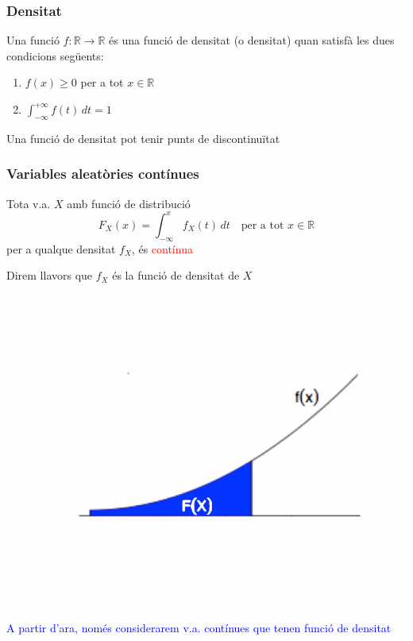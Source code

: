 \documentclass[12pt,t]{beamer}\usepackage[]{graphicx}\usepackage[]{color}
\newcommand{\red}[1]{\textcolor{red}{#1}}
\newcommand{\blue}[1]{\textcolor{blue}{#1}}
\renewcommand{\emph}[1]{{\color{red}#1}}
\newcommand{\RR}{\mathbb{R}}
\renewcommand{\geq}{\geqslant}
\theoremstyle{plain}
\theoremstyle{definition}
\begin{document}
\begin{frame}
\frametitle{Densitat}

Una funció $f:\RR\to \RR$ és una \emph{funció de densitat} (o
 \emph{densitat}) quan satisfà les dues condicions següents:
\medskip

\begin{enumerate} 
 \item $f(x)\geq 0$ per a tot $x\in \RR$
\medskip

\item $\displaystyle\int_{-\infty}^{+\infty} f(t)\, dt=1$
\end{enumerate}
\medskip



Una funció de densitat pot tenir punts de discontinuïtat

\end{frame}

\begin{frame}
\frametitle{Variables aleatòries contínues}

Tota v.a. $X$ amb funció de distribució 
$$
\displaystyle F_X(x)=\int_{-\infty}^x f_{X}(t)\, dt\quad \mbox{per a tot $x\in \RR$}
$$ 
per a qualque densitat $f_X$, és \red{contínua}
\medskip

Direm llavors que $f_X$ és la \emph{funció de densitat} de $X$
\vspace*{-2ex}

\begin{center}
\includegraphics[width=0.55\linewidth]{graficadensidad3}
\end{center}
\vspace*{-2ex}

\blue{A partir d'ara, només considerarem v.a. contínues que tenen funció de densitat}
\end{frame}
\end{document}

